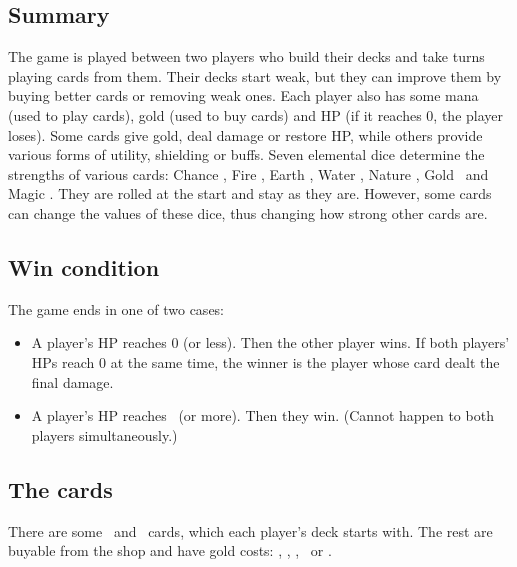 \documentclass[dvipsnames,parskip,a4paper]{scrartcl}
\begin{document}
\maketitle

\newpage

\subsection*{Summary}

The game is played between two players who build their decks and take turns playing cards from them. Their decks start weak, but they can improve them by buying better cards or removing weak ones. Each player also has some mana (used to play cards), gold (used to buy cards) and HP (if it reaches 0, the player loses). Some cards give gold, deal damage or restore HP, while others provide various forms of utility, shielding or buffs. Seven elemental dice determine the strengths of various cards: Chance \chance, Fire \fire, Earth \earth, Water \water, Nature \nature, Gold \gold \ and Magic \magic. They are rolled at the start and stay as they are. However, some cards can change the values of these dice, thus changing how strong other cards are.

\subsection*{Win condition}

The game ends in one of two cases:

\begin{itemize}
\item A player's HP reaches 0 (or less). Then the other player wins. If both players' HPs reach 0 at the same time, the winner is the player whose card dealt the final damage.
\item A player's HP reaches \maxhp \ (or more). Then they win. (Cannot happen to both players simultaneously.)
\end{itemize}

\subsection*{The cards}

There are some \starter \ and \draft \ cards, which each player's deck starts with. The rest are buyable from the shop and have gold costs: \onecost, \twocost, \threecost, \fourcost \ or \fivecost.

\vspace{4pt}
\end{document}

